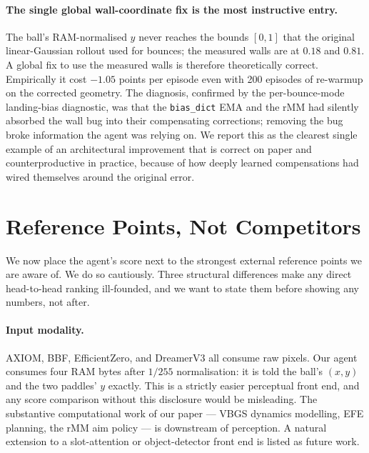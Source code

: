 \documentclass[runningheads]{llncs}
\begin{document}
\paragraph{The single global wall-coordinate fix is the most
instructive entry.}
The ball's RAM-normalised $y$ never reaches the bounds $[0, 1]$
that the original linear-Gaussian rollout used for bounces; the
measured walls are at $0.18$ and $0.81$. A global fix to use the
measured walls is therefore theoretically correct. Empirically it
cost $-1.05$ points per episode even with 200 episodes of
re-warmup on the corrected geometry. The diagnosis, confirmed by
the per-bounce-mode landing-bias diagnostic, was that the
\texttt{bias\_dict} EMA and the rMM had silently absorbed the wall
bug into their compensating corrections; removing the bug broke
information the agent was relying on. We report this as the
clearest single example of an architectural improvement that is
correct on paper and counterproductive in practice, because of how
deeply learned compensations had wired themselves around the
original error.

\section{Reference Points, Not Competitors}\label{sec:comparison}

We now place the agent's score next to the strongest external
reference points we are aware of. We do so cautiously. Three
structural differences make any direct head-to-head ranking
ill-founded, and we want to state them before showing any numbers,
not after.

\paragraph{Input modality.}
AXIOM, BBF, EfficientZero, and DreamerV3 all consume raw pixels.
Our agent consumes four RAM bytes after $1/255$ normalisation: it
is told the ball's $(x,y)$ and the two paddles' $y$ exactly. This
is a strictly easier perceptual front end, and any score
comparison without this disclosure would be misleading. The
substantive computational work of our paper --- VBGS dynamics
modelling, EFE planning, the rMM aim policy --- is downstream of
perception. A natural extension to a slot-attention or
object-detector front end is listed as future work.
\end{document}

